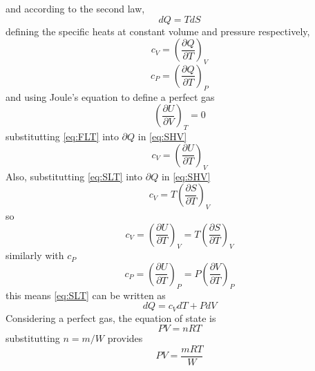%
%
and according to the second law,
\begin{equation}\label{eq:SLT}
dQ=TdS
\end{equation}%
%
defining the specific heats at constant volume and pressure respectively,
\begin{equation}\label{eq:SHV}
c_V=\left(\frac{\partial Q}{\partial T}\right)_V
\end{equation}
\begin{equation}\label{eq:SHP}
c_P=\left(\frac{\partial Q}{\partial T}\right)_P
\end{equation}
and using Joule's equation to define a perfect gas
\begin{equation}\label{eq:Joule}
\left(\frac{\partial U}{\partial V}\right)_T=0
\end{equation}
substitutting \ref{eq:FLT} into $\partial Q$ in \ref{eq:SHV}
\begin{equation}
c_V=\left(\frac{\partial U}{\partial T}\right)_V
\end{equation}
Also, substitutting \ref{eq:SLT} into $\partial Q$ in \ref{eq:SHV}
\begin{equation}
c_V=T\left(\frac{\partial S}{\partial T}\right)_V
\end{equation}
so
\begin{equation}\label{eq:cV}
c_V=\left(\frac{\partial U}{\partial T}\right)_V=T\left(\frac{\partial S}{\partial T}\right)_V
\end{equation}
similarly with $c_P$
\begin{equation}\label{cP}
c_P=\left(\frac{\partial U}{\partial T}\right)_P=P\left(\frac{\partial V}{\partial T}\right)_P
\end{equation}
this means \ref{eq:SLT} can be written as
\begin{equation}\label{eq:NewSLT}
dQ=c_VdT+PdV
\end{equation}
Considering a perfect gas, the equation of state is
\begin{equation}\label{eq:IGL}
PV=nRT
\end{equation}%
%
substitutting $n=m/W$ provides%
\begin{equation}
PV=\frac{mRT}{W}
\end{equation}
